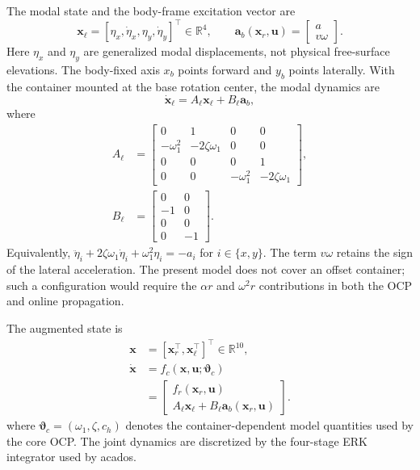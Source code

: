 The modal state and the body-frame excitation vector are
\begin{equation}
  \bm x_\ell
  =[\eta_x,\dot\eta_x,\eta_y,\dot\eta_y]^\top\in\mathbb R^4,
  \qquad
  \bm a_b(\bm x_r,\bm u)
  =
  \begin{bmatrix}a\\v\omega\end{bmatrix}.
  \label{eq:liquid_state_excitation}
\end{equation}
Here \(\eta_x\) and \(\eta_y\) are generalized modal displacements, not
physical free-surface elevations. The body-fixed axis \(x_b\) points forward
and \(y_b\) points laterally. With the container mounted at the base rotation
center, the modal dynamics are
\begin{equation}
  \dot{\bm x}_\ell
  =A_\ell\bm x_\ell+B_\ell\bm a_b,
  \label{eq:liquid_state_space}
\end{equation}
where
\begin{equation}
\begin{aligned}
  A_\ell
  &=
    \begin{bmatrix}
      0&1&0&0\\
      -\omega_1^2&-2\zeta\omega_1&0&0\\
      0&0&0&1\\
      0&0&-\omega_1^2&-2\zeta\omega_1
    \end{bmatrix},\\
  B_\ell
  &=
    \begin{bmatrix}
      0&0\\
      -1&0\\
      0&0\\
      0&-1
    \end{bmatrix}.
\end{aligned}
  \label{eq:liquid_dynamics}
\end{equation}
Equivalently,
\(\ddot\eta_i+2\zeta\omega_1\dot\eta_i+\omega_1^2\eta_i=-a_i\) for
\(i\in\{x,y\}\). The term \(v\omega\) retains the sign of the lateral
acceleration. The present model does not cover an offset container; such a
configuration would require the \(\alpha r\) and \(\omega^2r\) contributions
in both the OCP and online propagation.

The augmented state is
\begin{equation}
\begin{aligned}
  \bm x
  &=[\bm x_r^\top,\bm x_\ell^\top]^\top\in\mathbb R^{10},\\
  \dot{\bm x}
  &=f_c(\bm x,\bm u;\bm\vartheta_c)\\
  &=
  \begin{bmatrix}
    f_r(\bm x_r,\bm u)\\
    A_\ell\bm x_\ell+B_\ell\bm a_b(\bm x_r,\bm u)
  \end{bmatrix}.
\end{aligned}
  \label{eq:augmented_dynamics}
\end{equation}
where \(\bm\vartheta_c=(\omega_1,\zeta,c_h)\) denotes the
container-dependent model quantities used by the core OCP. The joint dynamics
are discretized by the four-stage ERK integrator used by acados.

